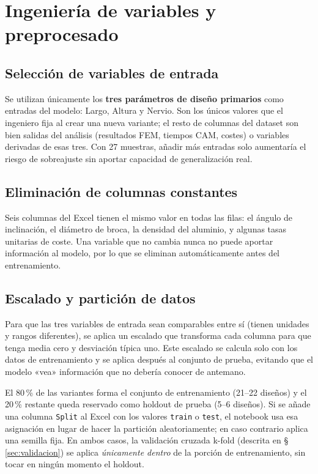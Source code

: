 \documentclass[11pt, a4paper]{article}
\begin{document}
\section{Ingeniería de variables y preprocesado}

\subsection{Selección de variables de entrada}

Se utilizan únicamente los \textbf{tres parámetros de diseño primarios} como entradas
del modelo: Largo, Altura y Nervio. Son los únicos valores que el ingeniero fija al
crear una nueva variante; el resto de columnas del dataset son bien salidas del
análisis (resultados FEM, tiempos CAM, costes) o variables derivadas de esas tres.
Con 27 muestras, añadir más entradas solo aumentaría el riesgo de sobreajuste sin
aportar capacidad de generalización real.

\subsection{Eliminación de columnas constantes}

Seis columnas del Excel tienen el mismo valor en todas las filas: el ángulo de
inclinación, el diámetro de broca, la densidad del aluminio, y algunas tasas unitarias
de coste. Una variable que no cambia nunca no puede aportar información al modelo, por
lo que se eliminan automáticamente antes del entrenamiento.

\subsection{Escalado y partición de datos}

Para que las tres variables de entrada sean comparables entre sí (tienen unidades y
rangos diferentes), se aplica un escalado que transforma cada columna para que tenga
media cero y desviación típica uno. Este escalado se calcula solo con los datos de
entrenamiento y se aplica después al conjunto de prueba, evitando que el modelo
«vea» información que no debería conocer de antemano.

El 80\,\% de las variantes forma el conjunto de entrenamiento (21--22 diseños) y el
20\,\% restante queda reservado como holdout de prueba (5--6 diseños). Si se añade
una columna \texttt{Split} al Excel con los valores \texttt{train} o \texttt{test},
el notebook usa esa asignación en lugar de hacer la partición aleatoriamente; en
caso contrario aplica una semilla fija. En ambos casos, la validación cruzada
k-fold (descrita en §\,\ref{sec:validacion}) se aplica \emph{únicamente dentro}
de la porción de entrenamiento, sin tocar en ningún momento el holdout.
\end{document}
